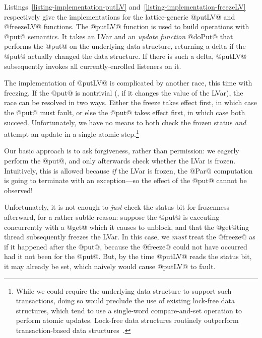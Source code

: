 \singlespacing

\doublespacing

Listings~\ref{listing-implementation-putLV}
and~\ref{listing-implementation-freezeLV} respectively give the
implementations for the lattice-generic @putLV@ and @freezeLV@
functions.  The @putLV@ function is used to build operations with
@put@ semantics.  It takes an LVar and an \emph{update function}
@doPut@ that performs the @put@ on the underlying data structure,
returning a delta if the @put@ actually changed the data structure.
If there is such a delta, @putLV@ subsequently invokes all
currently-enrolled listeners on it.

The implementation of @putLV@ is complicated by another race, this
time with freezing.  If the @put@ is nontrivial (\ie, if it changes
the value of the LVar), the race can be resolved in two ways.  Either
the freeze takes effect first, in which case the @put@ must fault, or
else the @put@ takes effect first, in which case both succeed.
Unfortunately, we have no means to both check the frozen status
\emph{and} attempt an update in a single atomic step.\footnote{While
  we could require the underlying data structure to support such
  transactions, doing so would preclude the use of existing lock-free
  data structures, which tend to use a single-word compare-and-set
  operation to perform atomic updates.  Lock-free data structures
  routinely outperform transaction-based data
  structures~\cite{practical-lock-freedom}.}

Our basic approach is to ask forgiveness, rather than permission: we
eagerly perform the @put@, and only afterwards check whether the LVar
is frozen.  Intuitively, this is allowed because \emph{if} the LVar is
frozen, the @Par@ computation is going to terminate with an
exception---so the effect of the @put@ cannot be observed!

Unfortunately, it is not enough to \emph{just} check the status bit
for frozenness afterward, for a rather subtle reason: suppose the
@put@ is executing concurrently with a @get@ which it causes to
unblock, and that the @get@ting thread subsequently freezes the LVar.
In this case, we \emph{must} treat the @freeze@ as if it happened
after the @put@, because the @freeze@ could not have occurred had it
not been for the @put@. But, by the time @putLV@ reads the status bit,
it may already be set, which naively would cause @putLV@ to fault.

